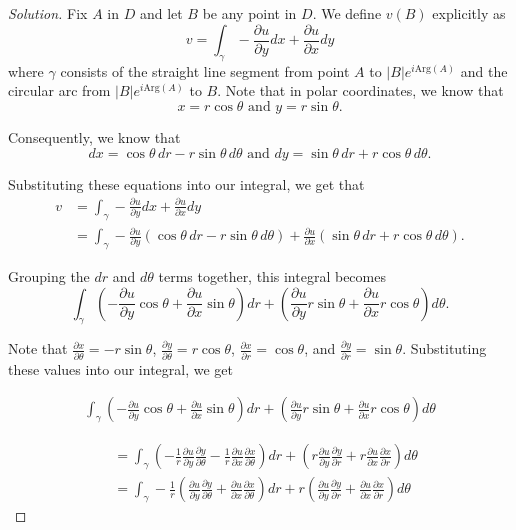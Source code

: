 \documentclass[11pt]{article}
\newenvironment{solution}
  {\renewcommand\qedsymbol{$\blacksquare$}\begin{proof}[Solution]}
  {\end{proof}}
\theoremstyle{definition}
\begin{document}
\begin{solution}
Fix $A$ in $D$ and let $B$ be any point in $D$. We define $v(B)$ explicitly as \[ v = \int_{\gamma} -\frac{\partial u}{\partial y} dx + \frac{\partial u}{\partial x} dy \]
where $\gamma$ consists of the straight line segment from point $A$ to $|B|e^{i\mathrm{Arg}(A)}$ and the circular arc from $|B|e^{i\mathrm{Arg}(A)}$ to $B$. Note that in polar coordinates, we know that
\[x = r\cos \theta \text{ and } y=r\sin \theta. \]

Consequently, we know that \[ dx = \cos\theta \, dr - r\sin \theta \, d\theta \text{ and } dy = \sin \theta \, dr + r \cos \theta \, d\theta.\]

Substituting these equations into our integral, we get that
\begin{align*}
	v &=  \int_{\gamma} -\frac{\partial u}{\partial y} dx + \frac{\partial u}{\partial x} dy \\
	&= \int_{\gamma} -\frac{\partial u}{\partial y} \left(  \cos\theta \, dr - r\sin \theta \, d\theta \right) + \frac{\partial u}{\partial x} \left( \sin \theta \, dr + r \cos \theta \, d\theta\right).\end{align*}

Grouping the $dr$ and $d\theta$ terms together, this integral becomes
\[ \int_{\gamma} \left( -\frac{\partial u}{\partial y} \cos \theta + \frac{\partial u}{\partial x} \sin \theta \right) dr + \left( \frac{\partial u}{\partial y} r\sin\theta + \frac{\partial u}{\partial x} r\cos\theta\right) d\theta. \]

Note that $\frac{\partial x}{\partial \theta} = -r\sin\theta$, $\frac{\partial y}{\partial \theta} = r\cos\theta$,  $\frac{\partial x}{\partial r} = \cos\theta$, and $\frac{\partial y}{\partial r} = \sin\theta$. Substituting these values into our integral, we get

\begin{align*}
	\int_{\gamma} \left( -\frac{\partial u}{\partial y} \cos \theta + \frac{\partial u}{\partial x} \sin \theta \right) dr + \left( \frac{\partial u}{\partial y} r\sin\theta + \frac{\partial u}{\partial x} r\cos\theta\right) d\theta
\end{align*}

\begin{align*}
	&= \int_{\gamma} \left( -\frac{1}{r} \frac{\partial u}{\partial y} \frac{\partial y}{\partial \theta} -\frac{1}{r} \frac{\partial u}{\partial x} \frac{\partial x}{\partial \theta} \right) dr + \left( r\frac{\partial u}{\partial y} \frac{\partial y}{\partial r} + r \frac{\partial u}{\partial x} \frac{\partial x}{\partial r}\right) d\theta \\
	&= \int_{\gamma} -\frac{1}{r} \left(  \frac{\partial u}{\partial y} \frac{\partial y}{\partial \theta} + \frac{\partial u}{\partial x} \frac{\partial x}{\partial \theta} \right) dr + 
	r\left( \frac{\partial u}{\partial y} \frac{\partial y}{\partial r} + \frac{\partial u}{\partial x} \frac{\partial x}{\partial r}\right) d\theta
\end{align*}


\end{solution}
\end{document}

